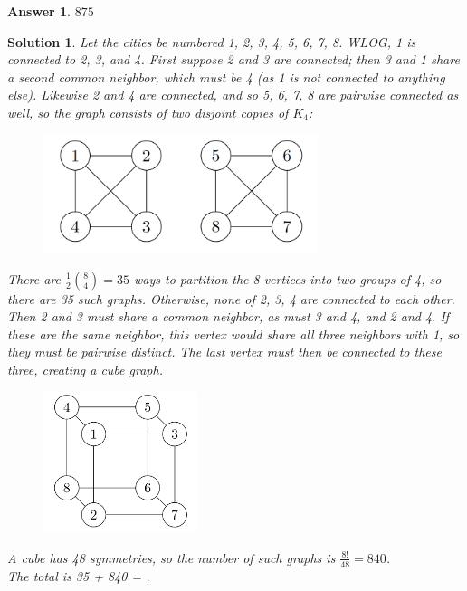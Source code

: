 \documentclass[12pt]{article}
\newtheorem*{answer*}{Answer}
\newtheorem*{solution*}{Solution}
\begin{document}
\begin{answer*}
    $\boxed{875}$
\end{answer*}

\begin{solution*}
Let the cities be numbered 1, 2, 3, 4, 5, 6, 7, 8. WLOG, 1 is connected to 2, 3, and 4. First
suppose 2 and 3 are connected; then 3 and 1 share a second common neighbor, which must be 4 (as
1 is not connected to anything else). Likewise 2 and 4 are connected, and so 5, 6, 7, 8 are pairwise
connected as well, so the graph consists of two disjoint copies of $K_4$:

\begin{figure}[H]
    \centering
    \includegraphics[width=8cm]{1.png}
    \label{fig:node-1}
\end{figure}

There are $\frac{1}{2} \left(\frac{8}{4}\right) = 35$ ways to partition the 8 vertices into two groups of 4, so there are 35 such graphs.
Otherwise, none of 2, 3, 4 are connected to each other. Then 2 and 3 must share a common neighbor, as
must 3 and 4, and 2 and 4. If these are the same neighbor, this vertex would share all three neighbors
with 1, so they must be pairwise distinct. The last vertex must then be connected to these three,
creating a cube graph.

\begin{figure}[H]
    \centering
    \includegraphics[width=4.5cm]{2.png}
    \label{fig:node-2}
\end{figure}

A cube has 48 symmetries, so the number of such graphs is $\frac{8!}{48} = 840$.\\
The total is 35 + 840 = .



\end{solution*}
\end{document}
